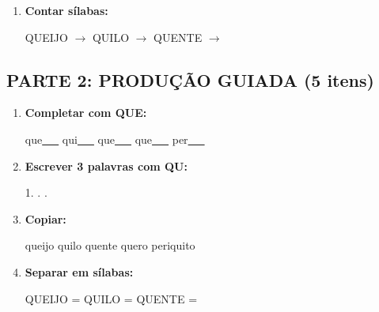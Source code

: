 \begin{exercicio}
\begin{enumerate}
  \item \textbf{Contar sílabas:}
  \begin{center}
  QUEIJO $\rightarrow$ \underline{\hspace{0.9cm}} \quad QUILO $\rightarrow$ \underline{\hspace{0.9cm}} \quad QUENTE $\rightarrow$ \underline{\hspace{0.9cm}}
  \end{center}

\end{enumerate}

\subsection*{PARTE 2: PRODUÇÃO GUIADA (5 itens)}

\begin{enumerate}[resume]

  \item \textbf{Completar com QUE:}
  \begin{center}
  que\underline{~~~} \quad qui\underline{~~~} \quad que\underline{~~~} \quad que\underline{~~~} \quad per\underline{~~~}
  \end{center}

  \item \textbf{Escrever 3 palavras com QU:}
  \begin{center}
  1. \underline{\hspace{3cm}} . \underline{\hspace{3cm}} . \underline{\hspace{3cm}}
  \end{center}

  \item \textbf{Copiar:}
  \begin{center}
  queijo \quad quilo \quad quente \quad quero \quad periquito
  \end{center}

  \item \textbf{Separar em sílabas:}
  \begin{center}
  QUEIJO = \underline{\hspace{1cm}} \underline{\hspace{1cm}} \quad QUILO = \underline{\hspace{1cm}} \underline{\hspace{1cm}} \quad QUENTE = \underline{\hspace{1cm}} \underline{\hspace{1cm}}
  \end{center}


\end{enumerate}
\end{exercicio}
